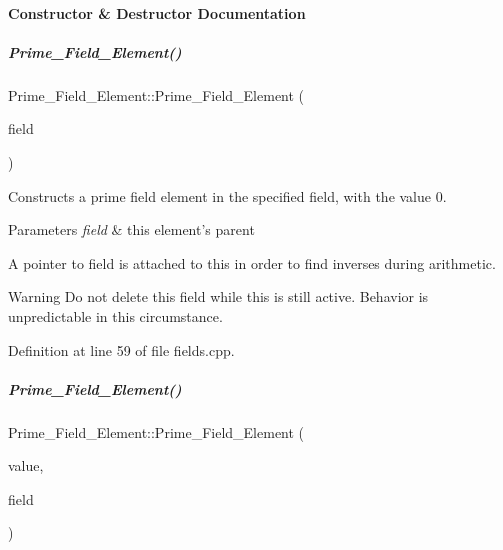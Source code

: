 \paragraph{Constructor \& Destructor Documentation}
\mbox{\label{group___fields_group_ac4a46053696a327bc62038e1cf92c20a}} 
\subparagraph{\texorpdfstring{Prime\+\_\+\+Field\+\_\+\+Element()}{Prime\_Field\_Element()}\hspace{0.1cm}{\footnotesize\ttfamily [1/2]}}
{\footnotesize\ttfamily Prime\+\_\+\+Field\+\_\+\+Element\+::\+Prime\+\_\+\+Field\+\_\+\+Element (\begin{DoxyParamCaption}\item[{const \hyperlink{group___fields_group_class_prime___field}{Prime\+\_\+\+Field} $\ast$}]{field }\end{DoxyParamCaption})}



Constructs a prime field element in the specified field, with the value 0. 


\begin{DoxyParams}{Parameters}
{\em field} & this element's parent\\
\hline
\end{DoxyParams}
A pointer to {\ttfamily field} is attached to {\ttfamily this} in order to find inverses during arithmetic. \begin{DoxyWarning}{Warning}
Do not delete this field while {\ttfamily this} is still active. Behavior is unpredictable in this circumstance. 
\end{DoxyWarning}


Definition at line 59 of file fields.\+cpp.

\mbox{\label{group___fields_group_a0bad5ba05aadbaf14876b2590e300861}} 
\subparagraph{\texorpdfstring{Prime\+\_\+\+Field\+\_\+\+Element()}{Prime\_Field\_Element()}\hspace{0.1cm}{\footnotesize\ttfamily [2/2]}}
{\footnotesize\ttfamily Prime\+\_\+\+Field\+\_\+\+Element\+::\+Prime\+\_\+\+Field\+\_\+\+Element (\begin{DoxyParamCaption}\item[{C\+O\+E\+F\+\_\+\+T\+Y\+PE}]{value,  }\item[{const \hyperlink{group___fields_group_class_prime___field}{Prime\+\_\+\+Field} $\ast$}]{field }\end{DoxyParamCaption})}



